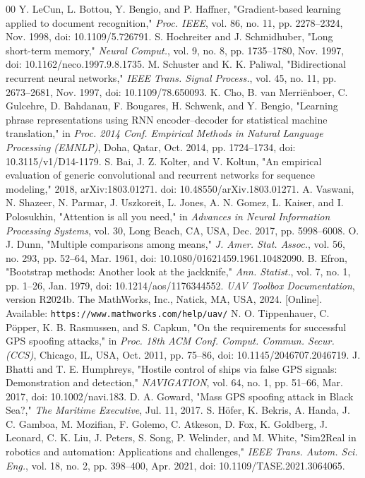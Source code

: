 \documentclass{ieeeaccess}
\begin{document}
\begin{thebibliography}{00}
 Y. LeCun, L. Bottou, Y. Bengio, and P. Haffner, "Gradient-based learning applied to document recognition," \textit{Proc. IEEE}, vol. 86, no. 11, pp. 2278--2324, Nov. 1998, doi: 10.1109/5.726791.
 S. Hochreiter and J. Schmidhuber, "Long short-term memory," \textit{Neural Comput.}, vol. 9, no. 8, pp. 1735--1780, Nov. 1997, doi: 10.1162/neco.1997.9.8.1735.
 M. Schuster and K. K. Paliwal, "Bidirectional recurrent neural networks," \textit{IEEE Trans. Signal Process.}, vol. 45, no. 11, pp. 2673--2681, Nov. 1997, doi: 10.1109/78.650093.
 K. Cho, B. van Merri\"enboer, C. Gulcehre, D. Bahdanau, F. Bougares, H. Schwenk, and Y. Bengio, "Learning phrase representations using RNN encoder--decoder for statistical machine translation," in \textit{Proc. 2014 Conf. Empirical Methods in Natural Language Processing (EMNLP)}, Doha, Qatar, Oct. 2014, pp. 1724--1734, doi: 10.3115/v1/D14-1179.
 S. Bai, J. Z. Kolter, and V. Koltun, "An empirical evaluation of generic convolutional and recurrent networks for sequence modeling," 2018, arXiv:1803.01271. doi: 10.48550/arXiv.1803.01271.
 A. Vaswani, N. Shazeer, N. Parmar, J. Uszkoreit, L. Jones, A. N. Gomez, L. Kaiser, and I. Polosukhin, "Attention is all you need," in \textit{Advances in Neural Information Processing Systems}, vol. 30, Long Beach, CA, USA, Dec. 2017, pp. 5998--6008.
 O. J. Dunn, "Multiple comparisons among means," \textit{J. Amer. Stat. Assoc.}, vol. 56, no. 293, pp. 52--64, Mar. 1961, doi: 10.1080/01621459.1961.10482090.
 B. Efron, "Bootstrap methods: Another look at the jackknife," \textit{Ann. Statist.}, vol. 7, no. 1, pp. 1--26, Jan. 1979, doi: 10.1214/aos/1176344552.
 \textit{UAV Toolbox Documentation}, version R2024b. The MathWorks, Inc., Natick, MA, USA, 2024. [Online]. Available: \texttt{https://www.mathworks.com/help/uav/}
 N. O. Tippenhauer, C. P\"opper, K. B. Rasmussen, and S. Capkun, "On the requirements for successful GPS spoofing attacks," in \textit{Proc. 18th ACM Conf. Comput. Commun. Secur. (CCS)}, Chicago, IL, USA, Oct. 2011, pp. 75--86, doi: 10.1145/2046707.2046719.
 J. Bhatti and T. E. Humphreys, "Hostile control of ships via false GPS signals: Demonstration and detection," \textit{NAVIGATION}, vol. 64, no. 1, pp. 51--66, Mar. 2017, doi: 10.1002/navi.183.
 D. A. Goward, "Mass GPS spoofing attack in Black Sea?," \textit{The Maritime Executive}, Jul. 11, 2017.
 S. H\"ofer, K. Bekris, A. Handa, J. C. Gamboa, M. Mozifian, F. Golemo, C. Atkeson, D. Fox, K. Goldberg, J. Leonard, C. K. Liu, J. Peters, S. Song, P. Welinder, and M. White, "Sim2Real in robotics and automation: Applications and challenges," \textit{IEEE Trans. Autom. Sci. Eng.}, vol. 18, no. 2, pp. 398--400, Apr. 2021, doi: 10.1109/TASE.2021.3064065.

\end{thebibliography}
\end{document}
